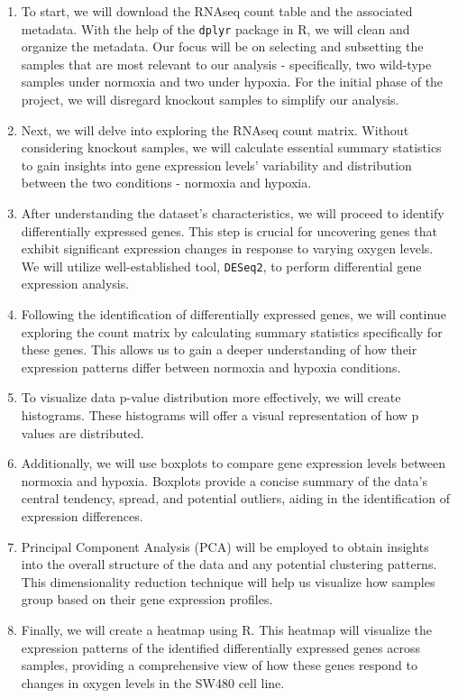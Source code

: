 \documentclass[
]{book}
\begin{document}
\begin{enumerate}
\def\labelenumi{\arabic{enumi}.}
\item
  To start, we will download the RNAseq count table and the associated metadata. With the help of the \texttt{dplyr} package in R, we will clean and organize the metadata. Our focus will be on selecting and subsetting the samples that are most relevant to our analysis - specifically, two wild-type samples under normoxia and two under hypoxia. For the initial phase of the project, we will disregard knockout samples to simplify our analysis.
\item
  Next, we will delve into exploring the RNAseq count matrix. Without considering knockout samples, we will calculate essential summary statistics to gain insights into gene expression levels' variability and distribution between the two conditions - normoxia and hypoxia.
\item
  After understanding the dataset's characteristics, we will proceed to identify differentially expressed genes. This step is crucial for uncovering genes that exhibit significant expression changes in response to varying oxygen levels. We will utilize well-established tool, \texttt{DESeq2}, to perform differential gene expression analysis.
\item
  Following the identification of differentially expressed genes, we will continue exploring the count matrix by calculating summary statistics specifically for these genes. This allows us to gain a deeper understanding of how their expression patterns differ between normoxia and hypoxia conditions.
\item
  To visualize data p-value distribution more effectively, we will create histograms. These histograms will offer a visual representation of how p values are distributed.
\item
  Additionally, we will use boxplots to compare gene expression levels between normoxia and hypoxia. Boxplots provide a concise summary of the data's central tendency, spread, and potential outliers, aiding in the identification of expression differences.
\item
  Principal Component Analysis (PCA) will be employed to obtain insights into the overall structure of the data and any potential clustering patterns. This dimensionality reduction technique will help us visualize how samples group based on their gene expression profiles.
\item
  Finally, we will create a heatmap using R. This heatmap will visualize the expression patterns of the identified differentially expressed genes across samples, providing a comprehensive view of how these genes respond to changes in oxygen levels in the SW480 cell line.
\end{enumerate}
\end{document}
